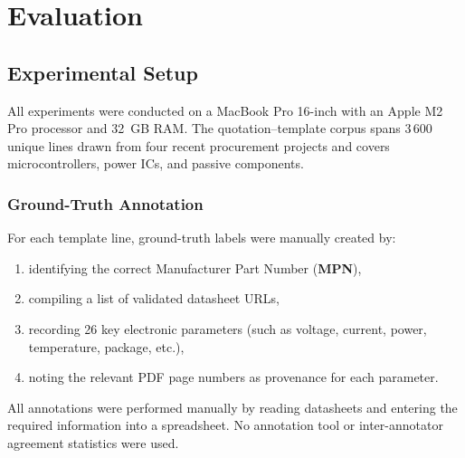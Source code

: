 \chapter{Evaluation}
\label{chapter:evaluation}

\section{Experimental Setup}
All experiments were conducted on a MacBook Pro 16-inch with an Apple M2 Pro processor and 32~GB RAM. The quotation–template corpus spans 3\,600 unique lines drawn from four recent procurement projects and covers microcontrollers, power ICs, and passive components.

\subsection{Ground-Truth Annotation}
For each template line, ground-truth labels were manually created by:
\begin{enumerate}
  \item identifying the correct Manufacturer Part Number (\textbf{MPN}),
  \item compiling a list of validated datasheet URLs,
  \item recording 26 key electronic parameters (such as voltage, current, power, temperature, package, etc.),
  \item noting the relevant PDF page numbers as provenance for each parameter.
\end{enumerate}
All annotations were performed manually by reading datasheets and entering the required information into a spreadsheet. No annotation tool or inter-annotator agreement statistics were used.

